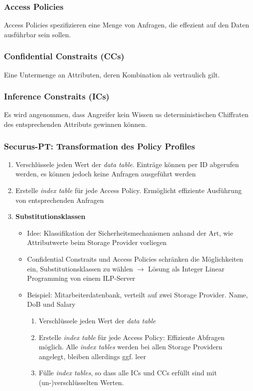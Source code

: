 \subsubsection{Access Policies} 
Access Policies spezifizieren eine Menge von Anfragen, die effezient auf den Daten ausführbar sein sollen.

\subsubsection{Confidential Constraits (CCs)}
Eine Untermenge an Attributen, deren Kombination als vertraulich gilt.

\subsubsection{Inference Constraits (ICs)}
Es wird angenommen, dass Angreifer kein Wissen us deterministischen Chiffraten des entsprechenden Attributs gewinnen können.

\subsubsection{Securus-PT: Transformation des Policy Profiles}
\begin{enumerate}
	\item Verschlüssele jeden Wert der \textit{data table}. Einträge können per ID abgerufen werden, es können jedoch keine Anfragen ausgeführt werden
	\item Erstelle \textit{index table} für jede Access Policy. Ermöglicht effiziente Ausführung von entsprechenden Anfragen
	\item \textbf{Substitutionsklassen}
	\begin{itemize}
		\item Idee: Klassifikation der Sicherheitsmechanismen anhand der Art, wie Attributwerte beim Storage Provider vorliegen
		\item Confidential Constraits und Access Policies schränken die Möglichkeiten ein, Substitutionsklassen zu wählen $\rightarrow$ Lösung als Integer Linear Programming von einem ILP-Server
		\item Beispiel: Mitarbeiterdatenbank, verteilt auf zwei Storage Provider. Name, DoB und Salary
		\begin{enumerate}
			\item Verschlüssele jeden Wert der \textit{data table}
			\item Erstelle \textit{index table} für jede Access Policy: Effiziente Abfragen möglich. Alle \textit{index tables} werden bei allen Storage Providern angelegt, bleiben allerdings ggf. leer
			\item Fülle \textit{index tables}, so dass alle ICs und CCs erfüllt sind mit (un-)verschlüsselten Werten.
		\end{enumerate}
	\end{itemize}
\end{enumerate}

